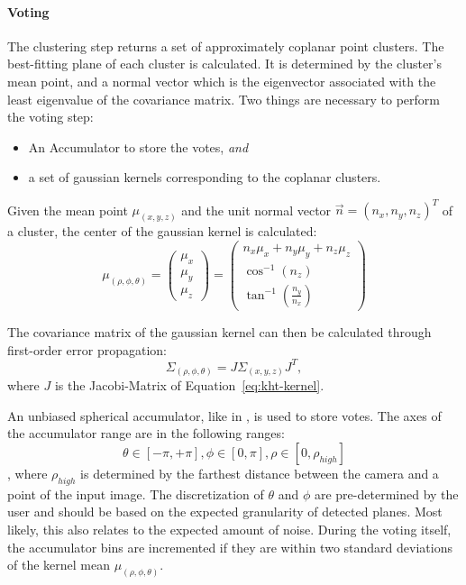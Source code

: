 \documentclass[main.tex]{subfiles}
\begin{document}
\paragraph{Voting}
The clustering step returns a set of approximately coplanar point clusters.
The best-fitting plane of each cluster is calculated. It is determined by the cluster's mean point,
and a normal vector which is the eigenvector associated with the least eigenvalue of the covariance matrix.
Two things are necessary to perform the voting step:
\begin{itemize}
    \item An Accumulator to store the votes, \textit{and}
    \item a set of gaussian kernels corresponding to the coplanar clusters.
\end{itemize}
Given the mean point $\mu_{(x,y,z)}$ and the unit normal vector $\overrightarrow{n}=(n_x,n_y,n_z)^T$ of a cluster,
the center of the gaussian kernel is calculated:
\def\A{
    \begin{pmatrix}
        \mu_x \\
        \mu_y \\
        \mu_z
    \end{pmatrix}
}
\def\B{
    \begin{matrix}
        n_x\mu_x + n_y\mu_y + n_z\mu_z \\
        \cos^{-1}(n_z)                 \\
        \tan^{-1}(\frac{n_y}{n_x})
    \end{matrix}
}
\begin{equation}
    \label{eq:kht-kernel}
    \mu_{(\rho,\phi,\theta)} = \A =  \left(\B\right)
\end{equation}

The covariance matrix of the gaussian kernel can then be calculated through first-order error propagation:
\begin{equation}
    \Sigma_{(\rho,\phi,\theta)} = J\Sigma_{(x,y,z)}J^T,
\end{equation}
where $J$ is the Jacobi-Matrix of Equation~\ref{eq:kht-kernel}.

An unbiased spherical accumulator, like in \cite{Borrmann_Elseberg_Lingemann_Nüchter_2011}, is used to store votes.
The axes of the accumulator range are in the following ranges:
$$\theta \in [-\pi , +\pi], \phi \in [0, \pi], \rho \in [0, \rho_{high}]$$,
where $\rho_{high}$ is determined by the farthest distance between the camera and a point of the input image.
The discretization of $\theta$ and $\phi$ are pre-determined by the user and should be based on the expected
granularity of detected planes. Most likely, this also relates to the expected amount of noise.
During the voting itself, the accumulator bins are incremented if they are within two standard deviations of the
kernel mean $\mu_{(\rho,\phi,\theta)}$.
\end{document}
